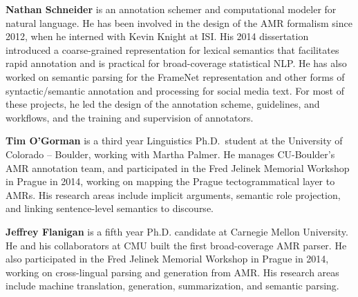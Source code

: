 \begin{bio}
{\bfseries Nathan Schneider} is an annotation schemer and
computational modeler for natural language. He has been involved in
the design of the AMR formalism since 2012, when he interned with
Kevin Knight at ISI. His 2014 dissertation introduced a coarse-grained
representation for lexical semantics that facilitates rapid annotation
and is practical for broad-coverage statistical NLP. He has also
worked on semantic parsing for the FrameNet representation and other
forms of syntactic/semantic annotation and processing for social media
text. For most of these projects, he led the design of the annotation
scheme, guidelines, and workflows, and the training and supervision of
annotators.

{\bfseries Tim O'Gorman} is a third year Linguistics Ph.D.\ student at
the University of Colorado -- Boulder, working with Martha Palmer. He
manages CU-Boulder’s AMR annotation team, and participated in the Fred
Jelinek Memorial Workshop in Prague in 2014, working on mapping the
Prague tectogrammatical layer to AMRs. His research areas include
implicit arguments, semantic role projection, and linking
sentence-level semantics to discourse.

{\bfseries Jeffrey Flanigan} is a fifth year Ph.D. candidate at
Carnegie Mellon University. He and his collaborators at CMU built the
first broad-coverage AMR parser. He also participated in the Fred
Jelinek Memorial Workshop in Prague in 2014, working on cross-lingual
parsing and generation from AMR. His research areas include machine
translation, generation, summarization, and semantic parsing.
\end{bio}

